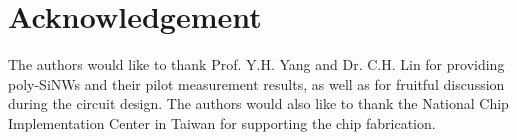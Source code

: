 \documentclass{article}
\begin{document}
\section*{Acknowledgement}
The authors would like to thank Prof. Y.H. Yang and Dr. C.H. Lin for providing poly-SiNWs and
their pilot measurement results, as well as for fruitful discussion during the circuit design.
The authors would also like to thank the National Chip Implementation Center in Taiwan
for supporting the chip fabrication.


\end{document}
